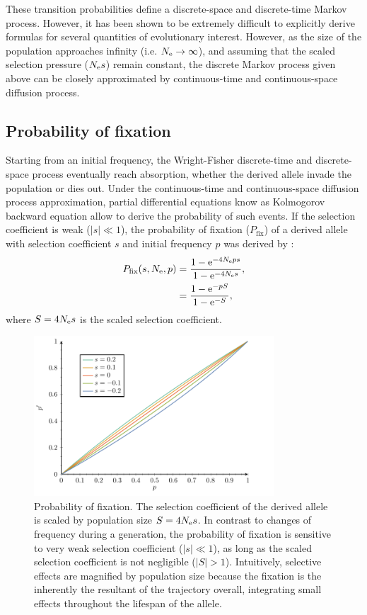 These {transition} probabilities define a discrete-space and discrete-time Markov process.
However, it has been shown to be extremely difficult to explicitly derive formulas for several quantities of evolutionary interest.
However, as the size of the population approaches infinity (i.e. $ N_{\textrm{e}} \to \infty$), and assuming that the scaled selection pressure ($N_{\textrm{e}} s $) remain constant, the discrete Markov process given above can be closely approximated by continuous-time and continuous-space diffusion process.\\

\subsection{Probability of fixation}
Starting from an initial frequency, the Wright-Fisher discrete-time and discrete-space process eventually reach absorption, whether the derived \gls{allele} invade the population or dies out. 
Under the continuous-time and continuous-space diffusion process approximation, partial differential equations know as Kolmogorov backward equation allow to derive the probability of such events. 
If the selection coefficient is weak ($|s| \ll 1$), the probability of fixation ($P_{\mathrm{fix}}$) of a derived \gls{allele} with selection coefficient $s$ and initial frequency $p$ was derived by \citet{Kimura1962}:
\begin{align}
P_{\mathrm{fix}}(s, N_{\textrm{e}}, p) & = \dfrac{1 - \mathrm{e}^{-4 N_{\textrm{e}} p s }}{1 - \mathrm{e}^{-4 N_{\textrm{e}} s}},\\
			     & = \dfrac{1 - \mathrm{e}^{- p S }}{1 - \mathrm{e}^{-S}},
\end{align}
where $S = 4 N_{\textrm{e}} s$ is the scaled selection coefficient.
\begin{figure}[H]
	\centering
	\includegraphics[width=0.8\textwidth, page=3] {figures.pdf}
	\caption[Probability of fixation]{
	Probability of fixation.
	The selection coefficient of the derived \gls{allele} is scaled by population size $S=4 N_{\textrm{e}} s$.
	In contrast to changes of frequency during a generation, the probability of fixation is sensitive to very weak selection coefficient ($|s| \ll 1$), as long as the scaled selection coefficient is not negligible ($|S| > 1$).
	Intuitively, selective effects are magnified by population size because the fixation is the inherently the resultant of the trajectory overall, integrating small effects throughout the lifespan of the \gls{allele}. }
\end{figure}

